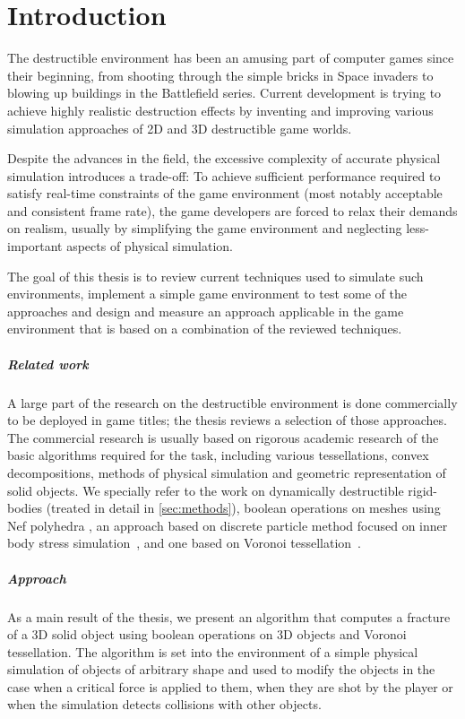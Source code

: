 \chapter*{Introduction}
The destructible environment has been an amusing part of computer games since their beginning, from shooting through the simple bricks in Space invaders to blowing up buildings in the Battlefield series. Current development is trying to achieve highly realistic destruction effects by inventing and improving various simulation approaches of 2D and 3D destructible game worlds.

Despite the advances in the field, the excessive complexity of accurate physical simulation introduces a trade-off: To achieve sufficient performance required to satisfy real-time constraints of the game environment (most notably acceptable and consistent frame rate), the game developers are forced to relax their demands on realism, usually by simplifying the game environment and neglecting less-important aspects of physical simulation.

The goal of this thesis is to review current techniques used to simulate such environments, implement a simple game environment to test some of the approaches and design and measure an approach applicable in the game environment that is based on a combination of the reviewed techniques.

\paragraph{Related work}
A large part of the research on the destructible environment is done commercially to be deployed in game titles; the thesis reviews a selection of those approaches. The commercial research is usually based on rigorous academic research of the basic algorithms required for the task, including various tessellations, convex decompositions, methods of physical simulation and geometric representation of solid objects. We specially refer to the work on dynamically destructible rigid-bodies (treated in detail in \cref{sec:methods}), boolean operations on meshes using Nef polyhedra \citet{nefpoly}, an approach based on discrete particle method focused on inner body stress simulation~\cite{edem}, and one based on Voronoi tessellation~\cite{nvidia}.

\paragraph{Approach}
As a main result of the thesis, we present an algorithm that computes a fracture of a 3D solid object using boolean operations on 3D objects and Voronoi tessellation. The algorithm is set into the environment of a simple physical simulation of objects of arbitrary shape and used to modify the objects in the case when a critical force is applied to them, \ie when they are shot by the player or when the simulation detects collisions with other objects.

